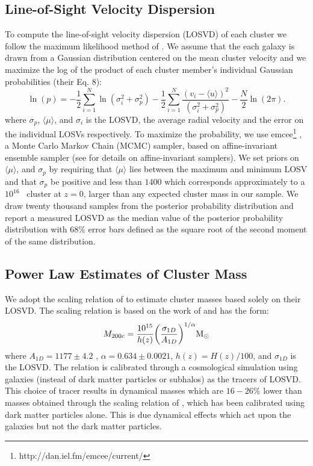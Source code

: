 \subsection{Line-of-Sight Velocity Dispersion}\label{2sec:LOSVD}
To compute the line-of-sight velocity dispersion (LOSVD) of each cluster we follow the maximum likelihood method of \cite{Walker2006}. We assume that the each galaxy is drawn from a Gaussian distribution centered on the mean cluster velocity and we maximize the log of the product of each cluster member's individual Gaussian probabilities (their Eq. 8):
\begin{equation}
  \label{2eq:log}
\ln(p)=-\frac{1}{2}\sum_{i=1}^{N}\ln(\sigma_i^2+\sigma_p^2)-\frac{1}{2}\sum_{i=1}^N\frac{(v_i-\langle u \rangle)^2}{(\sigma_i^2+\sigma_p^2)}-\frac{N}{2}\ln(2\pi).
\end{equation}
where $\sigma_p$, $\langle\mu\rangle$, and $\sigma_i$ is the LOSVD, the average radial velocity and the error on the individual LOSVs respectively. To maximize the probability, we use {\sc emcee}\footnote{http://dan.iel.fm/emcee/current/} \citep{Foreman-Mackey2013}, a Monte Carlo Markov Chain (MCMC) sampler, based on affine-invariant ensemble sampler (see \citealt{Goodman2010} for details on affine-invariant samplers). We set priors on $\langle\mu\rangle$, and $\sigma_p$ by requiring that $\langle\mu\rangle$ lies between the maximum and minimum LOSV and that $\sigma_p$ be positive and less than $1400$ \kms which corresponds approximately to a $10^{16}$ \Msol\ cluster at $z=0$, larger than any expected cluster mass in our sample. We draw twenty thousand samples from the posterior probability distribution and report a measured LOSVD as the median value of the posterior probability distribution with 68\% error bars defined as the square root of the second moment of the same distribution.

\subsection{Power Law Estimates of Cluster Mass}
We adopt the scaling relation of \cite{Munari2013} to estimate cluster masses based solely on their LOSVD. The scaling relation is based on the work of \cite{Evrard2008} and has the form: 
\begin{equation}\label{2eq:power law}
	M_{200c} = \frac{10^{15}}{h(z)} \bigg{(}\frac{\sigma_{1D}}{A_{1D}} \bigg{)}^{1/\alpha} \hbox{$\mathrm{M}_\odot$} 
\end{equation}
where $A_{1D} =1177\pm4.2$ \kms, $\alpha = 0.634\pm0.0021$, $h(z) = H(z)/100$, and $\sigma_{1D}$ is the LOSVD. The relation is calibrated through a cosmological simulation using galaxies (instead of dark matter particles or subhalos) as the tracers of LOSVD. This choice of tracer results in dynamical masses which are $16-26\%$ lower  than masses obtained through the scaling relation of \cite{Evrard2008}, which has been calibrated using dark matter particles alone. This is due dynamical effects which act upon the galaxies but not the dark matter particles.

